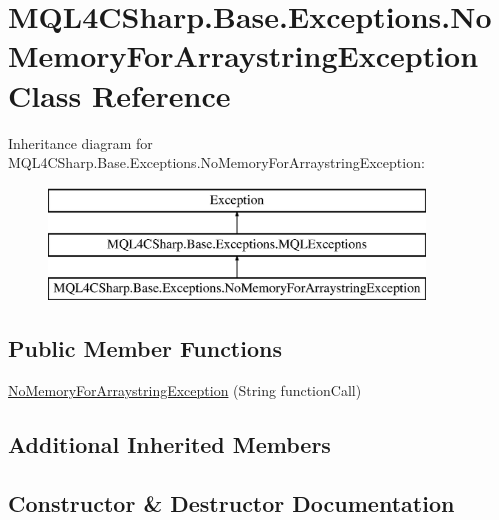 \hypertarget{class_m_q_l4_c_sharp_1_1_base_1_1_exceptions_1_1_no_memory_for_arraystring_exception}{}\section{M\+Q\+L4\+C\+Sharp.\+Base.\+Exceptions.\+No\+Memory\+For\+Arraystring\+Exception Class Reference}
\label{class_m_q_l4_c_sharp_1_1_base_1_1_exceptions_1_1_no_memory_for_arraystring_exception}
Inheritance diagram for M\+Q\+L4\+C\+Sharp.\+Base.\+Exceptions.\+No\+Memory\+For\+Arraystring\+Exception\+:\begin{figure}[H]
\begin{center}
\leavevmode
\includegraphics[height=3.000000cm]{class_m_q_l4_c_sharp_1_1_base_1_1_exceptions_1_1_no_memory_for_arraystring_exception}
\end{center}
\end{figure}
\subsection*{Public Member Functions}
\begin{DoxyCompactItemize}
\item 
\hyperlink{class_m_q_l4_c_sharp_1_1_base_1_1_exceptions_1_1_no_memory_for_arraystring_exception_a4fb28b5b4a3d914380c5c8442bbc4f9e}{No\+Memory\+For\+Arraystring\+Exception} (String function\+Call)
\end{DoxyCompactItemize}
\subsection*{Additional Inherited Members}


\subsection{Constructor \& Destructor Documentation}
